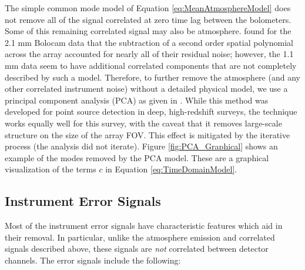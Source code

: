 \documentclass[12pt,preprint]{aastex}
\begin{document}
The simple common mode model of Equation \ref{eq:MeanAtmosphereModel}
does not remove all of the signal correlated at zero time lag between
the bolometers.  Some of this remaining correlated signal may also be
atmosphere.  \citet{sayers10} found for the 2.1 mm Bolocam data that
the subtraction of a second order spatial polynomial across the array
accounted for nearly all of their residual noise; however, the 1.1 mm
data seem to have additional correlated components that are not
completely described by such a model.  Therefore, to further remove
the atmosphere (and any other correlated instrument noise) without a
detailed physical model, we use a principal component analysis (PCA)
as given in \citet{laurent05}.  While this method was developed for
point source detection in deep, high-redshift surveys, the technique
works equally well for this survey, with the caveat that it removes
large-scale structure on the size of the array FOV.  This effect is
mitigated by the iterative process (the \citet{laurent05} analysis did
not iterate).  Figure \ref{fig:PCA_Graphical} shows an example of the
modes removed by the PCA model.  These are a graphical visualization
of the terms $c$ in Equation \ref{eq:TimeDomainModel}.

\subsection{Instrument Error Signals}
\label{sec:InstrumentErrors}

Most of the instrument error signals have characteristic features
which aid in their removal.  In particular, unlike the atmosphere
emission and correlated signals described above, these signals are
{\it not} correlated between detector channels.  The error signals
include the following:
\end{document}
